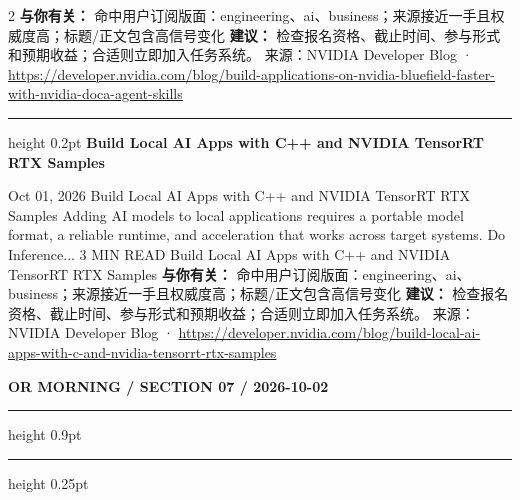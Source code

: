 \documentclass[10.5pt]{ctexart}
\begin{document}
\begin{multicols}{2}
\textbf{与你有关：} 命中用户订阅版面：engineering、ai、business；来源接近一手且权威度高；标题/正文包含高信号变化
\textbf{建议：} 检查报名资格、截止时间、参与形式和预期收益；合适则立即加入任务系统。
{\footnotesize\color{ormuted} 来源：NVIDIA Developer Blog · \url{https://developer.nvidia.com/blog/build-applications-on-nvidia-bluefield-faster-with-nvidia-doca-agent-skills}}
\vspace{2mm}
\hrule height 0.2pt
\vspace{2mm}
{\large\bfseries Build Local AI Apps with C++ and NVIDIA TensorRT RTX Samples}\par
Oct 01, 2026 Build Local AI Apps with C++ and NVIDIA TensorRT RTX Samples Adding AI models to local applications requires a portable model format, a reliable runtime, and acceleration that works across target systems. Do Inference... 3 MIN READ Build Local AI Apps with C++ and NVIDIA TensorRT RTX Samples
\textbf{与你有关：} 命中用户订阅版面：engineering、ai、business；来源接近一手且权威度高；标题/正文包含高信号变化
\textbf{建议：} 检查报名资格、截止时间、参与形式和预期收益；合适则立即加入任务系统。
{\footnotesize\color{ormuted} 来源：NVIDIA Developer Blog · \url{https://developer.nvidia.com/blog/build-local-ai-apps-with-c-and-nvidia-tensorrt-rtx-samples}}
\end{multicols}
\newpage
{\small\bfseries OR MORNING / SECTION 07 / 2026-10-02}
\vspace{2mm}
\hrule height 0.9pt
\vspace{1.5mm}
\hrule height 0.25pt
\vspace{4mm}
\end{document}
